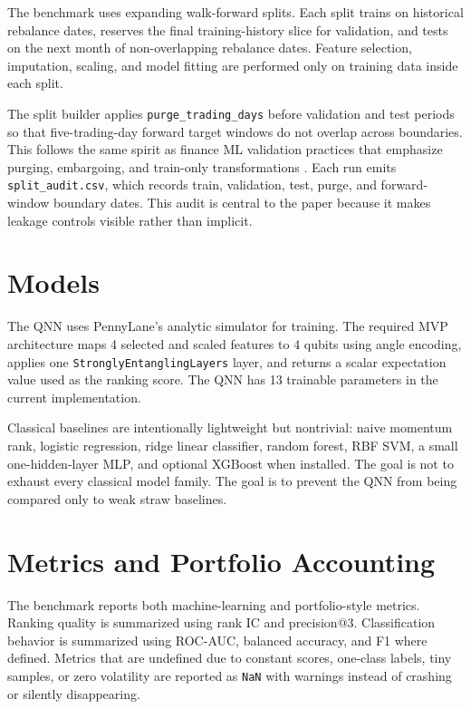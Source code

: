 \documentclass[11pt]{article}
\newcommand{\smallcode}[1]{{\small\texttt{#1}}}
\begin{document}
The benchmark uses expanding walk-forward splits. Each split trains on historical rebalance dates, reserves the final training-history slice for validation, and tests on the next month of non-overlapping rebalance dates. Feature selection, imputation, scaling, and model fitting are performed only on training data inside each split.

The split builder applies \smallcode{purge\_trading\_days} before validation and test periods so that five-trading-day forward target windows do not overlap across boundaries. This follows the same spirit as finance ML validation practices that emphasize purging, embargoing, and train-only transformations \cite{lopezdeprado2018afml}. Each run emits \texttt{split\_audit.csv}, which records train, validation, test, purge, and forward-window boundary dates. This audit is central to the paper because it makes leakage controls visible rather than implicit.

\section{Models}

The QNN uses PennyLane's analytic simulator for training. The required MVP architecture maps 4 selected and scaled features to 4 qubits using angle encoding, applies one \smallcode{StronglyEntanglingLayers} layer, and returns a scalar expectation value used as the ranking score. The QNN has 13 trainable parameters in the current implementation.

Classical baselines are intentionally lightweight but nontrivial: naive momentum rank, logistic regression, ridge linear classifier, random forest, RBF SVM, a small one-hidden-layer MLP, and optional XGBoost when installed. The goal is not to exhaust every classical model family. The goal is to prevent the QNN from being compared only to weak straw baselines.

\section{Metrics and Portfolio Accounting}

The benchmark reports both machine-learning and portfolio-style metrics. Ranking quality is summarized using rank IC and precision@3. Classification behavior is summarized using ROC-AUC, balanced accuracy, and F1 where defined. Metrics that are undefined due to constant scores, one-class labels, tiny samples, or zero volatility are reported as \texttt{NaN} with warnings instead of crashing or silently disappearing.
\end{document}
